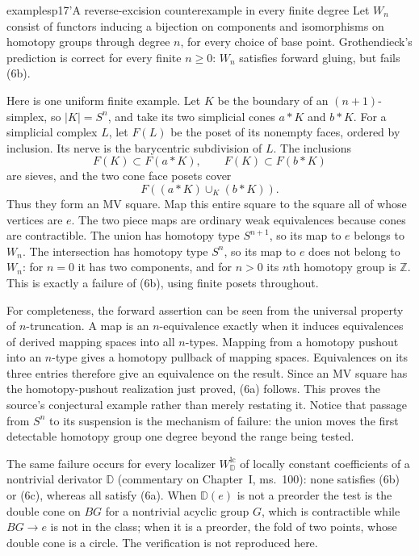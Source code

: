 \begin{dcomment}{examples}{p17'}{A reverse-excision counterexample in every finite degree}
Let $W_n$ consist of functors inducing a bijection on components and isomorphisms on homotopy groups through degree $n$, for every choice of base point. Grothendieck's prediction is correct for every finite $n\geq0$: $W_n$ satisfies forward gluing, but fails (6b).

Here is one uniform finite example. Let $K$ be the boundary of an $(n+1)$-simplex, so $|K|=S^n$, and take its two simplicial cones $a*K$ and $b*K$. For a simplicial complex $L$, let $F(L)$ be the poset of its nonempty faces, ordered by inclusion. Its nerve is the barycentric subdivision of $L$. The inclusions
\[
F(K)\subset F(a*K),\qquad F(K)\subset F(b*K)
\]
are sieves, and the two cone face posets cover
\[
F((a*K)\cup_K(b*K)).
\]
Thus they form an MV square. Map this entire square to the square all of whose vertices are $e$. The two piece maps are ordinary weak equivalences because cones are contractible. The union has homotopy type $S^{n+1}$, so its map to $e$ belongs to $W_n$. The intersection has homotopy type $S^n$, so its map to $e$ does not belong to $W_n$: for $n=0$ it has two components, and for $n>0$ its $n$th homotopy group is $\mathbb Z$. This is exactly a failure of (6b), using finite posets throughout.

For completeness, the forward assertion can be seen from the universal property of $n$-truncation. A map is an $n$-equivalence exactly when it induces equivalences of derived mapping spaces into all $n$-types. Mapping from a homotopy pushout into an $n$-type gives a homotopy pullback of mapping spaces. Equivalences on its three entries therefore give an equivalence on the result. Since an MV square has the homotopy-pushout realization just proved, (6a) follows. This proves the source's conjectural example rather than merely restating it. Notice that passage from $S^n$ to its suspension is the mechanism of failure: the union moves the first detectable homotopy group one degree beyond the range being tested.

The same failure occurs for every localizer $W^{\mathrm{lc}}_{\mathbb D}$ of locally constant coefficients of a nontrivial derivator $\mathbb D$ (commentary on Chapter~I, ms.~100): none satisfies (6b) or (6c), whereas all satisfy (6a). When $\mathbb D(e)$ is not a preorder the test is the double cone on $BG$ for a nontrivial acyclic group $G$, which is contractible while $BG\to e$ is not in the class; when it is a preorder, the fold of two points, whose double cone is a circle. The verification is not reproduced here.
\end{dcomment}

